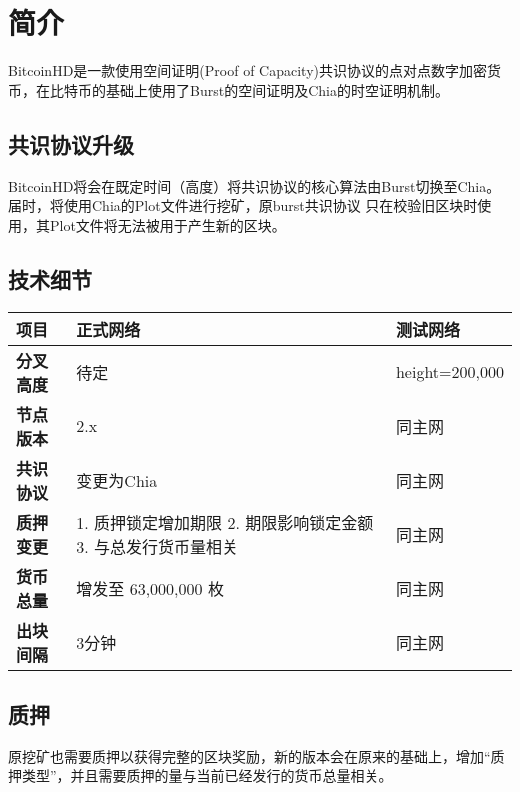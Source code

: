 \chapter{简介}
\begin{flushleft}
    BitcoinHD是一款使用空间证明(Proof of Capacity)共识协议的点对点数字加密货币，在比特币的基础上使用了Burst的空间证明及Chia的时空证明机制。
\end{flushleft}
\section{共识协议升级}
\begin{flushleft}
    BitcoinHD将会在既定时间（高度）将共识协议的核心算法由Burst切换至Chia。届时，将使用Chia的Plot文件进行挖矿，原burst共识协议
    只在校验旧区块时使用，其Plot文件将无法被用于产生新的区块。
\end{flushleft}
\section{技术细节}
\begin{tabular}{ |p{2cm}|p{7cm}|l| }
    \hline
    \rowcolor{lightgray} 项目 & 正式网络 & 测试网络 \\[5pt]
    \hline
    \rowcolor{lightgray!30} \textbf{分叉高度} & 待定 & height=200,000 \\[5pt]
    \textbf{节点版本} & 2.x & 同主网 \\[5pt]
    \rowcolor{lightgray!30} \textbf{共识协议} & 变更为Chia & 同主网 \\[5pt]
    \textbf{质押变更} & 1. 质押锁定增加期限 2. 期限影响锁定金额 3. 与总发行货币量相关 & 同主网 \\[5pt]
    \rowcolor{lightgray!30} \textbf{货币总量} & 增发至 63,000,000 枚 & 同主网 \\[5pt]
    \textbf{出块间隔} & 3分钟 & 同主网 \\[5pt]
    \hline
\end{tabular}
\section{质押}
\begin{flushleft}
    原挖矿也需要质押以获得完整的区块奖励，新的版本会在原来的基础上，增加``质押类型''，并且需要质押的量与当前已经发行的货币总量相关。
\end{flushleft}
